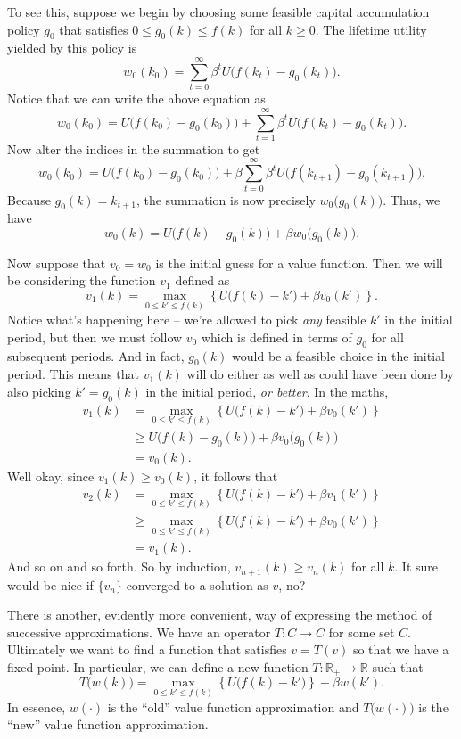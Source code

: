 \documentclass[12pt]{article}
\newcommand{\R}{\mathbb{R}}
\theoremstyle{definition}
\begin{document}
To see this, suppose we begin by choosing some feasible capital accumulation policy $g_0$ that satisfies $0 \leq g_0(k) \leq f(k)$ for all $k \geq 0$. The lifetime utility yielded by this policy is
	\[w_0(k_0) = \sum_{t=0}^{\infty} \beta^t U\big( f(k_t) - g_0(k_t) \big).	\]
Notice that we can write the above equation as 
	\[w_0(k_0) = U\big( f(k_0) - g_0(k_0) \big)	+  \sum_{t=1}^{\infty} \beta^t U\big( f(k_t) - g_0(k_t) \big). \]
Now alter the indices in the summation to get 
	\[w_0(k_0) = U\big( f(k_0) - g_0(k_0) \big)	+  \beta \sum_{t=0}^{\infty} \beta^t U\big( f(k_{t+1}) - g_0(k_{t+1}) \big). \]
Because $g_0(k)=k_{t+1}$, the summation is now precisely $w_0\big(g_0(k)\big)$. Thus, we have
\begin{equation}
	w_0(k) = U\big( f(k) - g_0(k) \big)	+ \beta w_0\big(g_0(k)\big).  \label{guess1}
\end{equation}
	
Now suppose that $v_0=w_0$ is the initial guess for a value function. Then we will be considering the function $v_1$ defined as
	\[v_1(k) = \max_{0 \leq k' \leq f(k)} \left\{U \big( f(k) - k' \big) + \beta v_0(k') \right\}.	\]
Notice what's happening here -- we're allowed to pick \emph{any} feasible $k'$ in the initial period, but then we must follow $v_0$ which is defined in terms of $g_0$ for all subsequent periods. And in fact, $g_0(k)$ would be a feasible choice in the initial period. This means that $v_1(k)$ will do either as well as could have been done by also picking $k'=g_0(k)$ in the initial period, \emph{or better}. In the maths,
\begin{align*}
	 v_1(k) &=  \max_{0 \leq k' \leq f(k)} \left\{U \big( f(k) - k' \big) + \beta v_0(k') \right\}\\
	 		& \geq U\big( f(k) - g_0(k) \big) + \beta v_0\big(g_0(k)\big)\\
	 		& = v_0(k).
\end{align*}
Well okay, since $v_1(k) \geq v_0(k)$, it follows that
\begin{align*}
	v_2(k) &= \max_{0 \leq k' \leq f(k)} \left\{U \big( f(k) - k' \big) + \beta v_1(k') \right\} \\
		&\geq \max_{0 \leq k' \leq f(k)} \left\{U \big( f(k) - k' \big) + \beta v_0(k') \right\}\\
		&= v_1(k).
\end{align*}
And so on and so forth. So by induction, $v_{n+1}(k) \geq v_n(k)$ for all $k$. It sure would be nice if $\{v_n\}$ converged to a solution as $v$, no?

There is another, evidently more convenient, way of expressing the method of successive approximations. We have an operator $T:C \rightarrow C$ for some set $C$. Ultimately we want to find a function that satisfies $v = T(v)$ so that we have a fixed point. In particular, we can define a new function $T:\R_+ \rightarrow \R$ such that
	\[T\big( w(k) \big) = \max_{0 \leq k' \leq f(k)} \left\{ U\big(f(k) - k' \big)\right\} + \beta w(k').	\]
In essence, $w(\cdot)$ is the ``old'' value function approximation and $T\big( w(\cdot) \big)$ is the ``new'' value function approximation.
\end{document}

